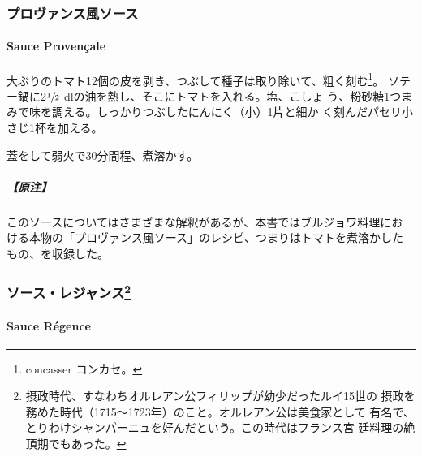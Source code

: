 \maeaki

\hypertarget{ux30d7ux30edux30f4ux30a1ux30f3ux30b9ux98a8ux30bdux30fcux30b9}{%
\subsubsection{プロヴァンス風ソース}\label{ux30d7ux30edux30f4ux30a1ux30f3ux30b9ux98a8ux30bdux30fcux30b9}}

\hypertarget{sauce-provencal}{%
\paragraph{Sauce Provençale}\label{sauce-provencal}}


大ぶりのトマト12個の皮を剥き、つぶして種子は取り除いて、粗く刻む\footnote{concasser
  コンカセ。}。 ソテー鍋に2\(\sfrac{1}{2}\)
dlの油を熱し、そこにトマトを入れる。塩、こしょ
う、粉砂糖1つまみで味を調える。しっかりつぶしたにんにく（小）1片と細か
く刻んだパセリ小さじ1杯を加える。

蓋をして弱火で30分間程、煮溶かす。

\hypertarget{ux539fux6ce8-7}{%
\subparagraph{【原注】}\label{ux539fux6ce8-7}}

このソースについてはさまざまな解釈があるが、本書ではブルジョワ料理にお
ける本物の「プロヴァンス風ソース」のレシピ、つまりはトマトを煮溶かした
もの、を収録した。

\maeaki

\hypertarget{ux30bdux30fcux30b9ux30ecux30b8ux30e3ux30f3ux30b975}{%
\subsubsection[ソース・レジャンス]{\texorpdfstring{ソース・レジャンス\footnote{摂政時代、すなわちオルレアン公フィリップが幼少だったルイ15世の
  摂政を務めた時代（1715〜1723年）のこと。オルレアン公は美食家として
  有名で、とりわけシャンパーニュを好んだという。この時代はフランス宮
  廷料理の絶頂期でもあった。}}{ソース・レジャンス}}\label{ux30bdux30fcux30b9ux30ecux30b8ux30e3ux30f3ux30b975}}

\hypertarget{sauce-regence}{%
\paragraph{Sauce Régence}\label{sauce-regence}}

